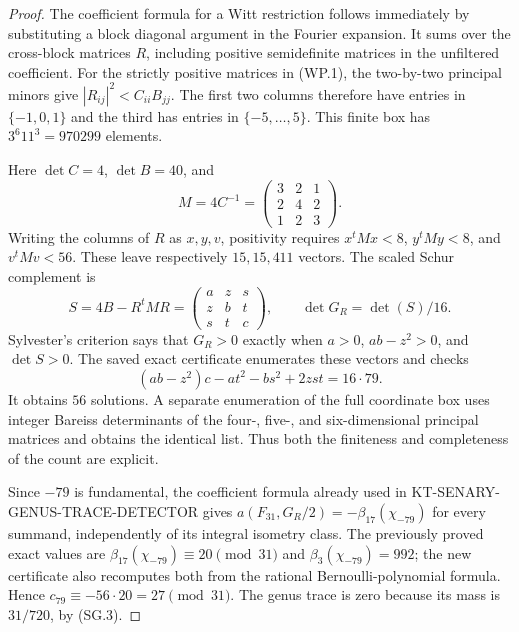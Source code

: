 \documentclass[11pt,a4paper]{article}
\theoremstyle{definition}
\begin{document}
\begin{proof}
The coefficient formula for a Witt restriction follows immediately by
substituting a block diagonal argument in the Fourier expansion.  It sums
over the cross-block matrices $R$, including positive semidefinite matrices
in the unfiltered coefficient.  For the strictly positive matrices in
(WP.1), the two-by-two principal minors give
$|R_{ij}|^2<C_{ii}B_{jj}$.  The first two columns therefore have entries
in $\{-1,0,1\}$ and the third has entries in $\{-5,\ldots,5\}$.
This finite box has $3^6 11^3=970299$ elements.

Here $\det C=4$, $\det B=40$, and
\[
 M=4C^{-1}=\begin{pmatrix}3&2&1\\2&4&2\\1&2&3\end{pmatrix}.
\]
Writing the columns of $R$ as $x,y,v$, positivity requires
$x^tMx<8$, $y^tMy<8$, and $v^tMv<56$.  These leave respectively
$15,15,411$ vectors.  The scaled Schur complement is
\[
 S=4B-R^tMR=\begin{pmatrix}a&z&s\\z&b&t\\s&t&c\end{pmatrix},
 \qquad \det G_R=\det(S)/16.
\]
Sylvester's criterion says that $G_R>0$ exactly when
$a>0$, $ab-z^2>0$, and $\det S>0$.  The saved exact certificate enumerates
these vectors and checks
\[
 (ab-z^2)c-at^2-bs^2+2zst=16\cdot79.
\]
It obtains $56$ solutions.  A separate enumeration of the full coordinate
box uses integer Bareiss determinants of the four-, five-, and six-dimensional
principal matrices and obtains the identical list.  Thus both the finiteness
and completeness of the count are explicit.

Since $-79$ is fundamental, the coefficient formula already used in
KT-SENARY-GENUS-TRACE-DETECTOR gives
$a(F_{31},G_R/2)=-\beta_{17}(\chi_{-79})$ for every summand, independently
of its integral isometry class.  The previously proved exact values are
$\beta_{17}(\chi_{-79})\equiv20\pmod{31}$ and
$\beta_3(\chi_{-79})=992$; the new certificate also recomputes both
from the rational Bernoulli-polynomial formula.  Hence
$c_{79}\equiv-56\cdot20=27\pmod{31}$.
The genus trace is zero because its mass is $31/720$, by (SG.3).
\end{proof}
\end{document}
